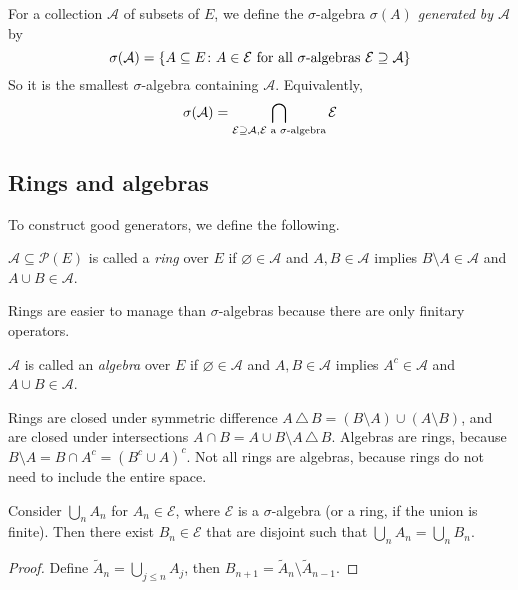\begin{definition}
	For a collection \( \mathcal A \) of subsets of \( E \), we define the \( \sigma \)-algebra \emph{\( \sigma(A) \) generated by \( \mathcal A \)} by
	\[ \sigma(\mathcal A) = \qty{A \subseteq E \colon A \in \mathcal E \text{ for all \( \sigma \)-algebras } \mathcal E \supseteq \mathcal A} \]
	So it is the smallest \( \sigma \)-algebra containing \( \mathcal A \).
	Equivalently,
	\[ \sigma(\mathcal A) = \bigcap_{\mathcal E \supseteq \mathcal A, \mathcal E \text{ a \( \sigma \)-algebra}} \mathcal E \]
\end{definition}

\subsection{Rings and algebras}
To construct good generators, we define the following.
\begin{definition}
	\( \mathcal A \subseteq \mathcal P(E) \) is called a \emph{ring} over \( E \) if \( \varnothing \in \mathcal A \) and \( A, B \in \mathcal A \) implies \( B \setminus A \in \mathcal A \) and \( A \cup B \in \mathcal A \).
\end{definition}
Rings are easier to manage than \( \sigma \)-algebras because there are only finitary operators.
\begin{definition}
	\( \mathcal A \) is called an \emph{algebra} over \( E \) if \( \varnothing \in \mathcal A \) and \( A, B \in \mathcal A \) implies \( A^c \in \mathcal A \) and \( A \cup B \in \mathcal A \).
\end{definition}
\begin{remark}
	Rings are closed under symmetric difference \( A \,\triangle\, B = (B \setminus A) \cup (A \setminus B) \), and are closed under intersections \( A \cap B = A \cup B \setminus A \,\triangle\, B \).
	Algebras are rings, because \( B \setminus A = B \cap A^c = (B^c \cup A)^c \).
	Not all rings are algebras, because rings do not need to include the entire space.
\end{remark}
\begin{proposition}
	Consider \( \bigcup_n A_n \) for \( A_n \in \mathcal E \), where \( \mathcal E \) is a \( \sigma \)-algebra (or a ring, if the union is finite).
	Then there exist \( B_n \in \mathcal E \) that are disjoint such that \( \bigcup_n A_n = \bigcup_n B_n \).
\end{proposition}
\begin{proof}
	Define \( \widetilde A_n = \bigcup_{j \leq n} A_j \), then \( B_{n+1} = \widetilde A_n \setminus \widetilde A_{n-1} \).
\end{proof}
